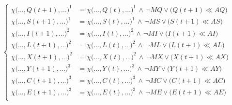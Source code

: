 \begin{equation}
 \begin{cases} 
 \chi\big(\dotsc, Q(t + 1), \dotsc \big)^1 	& = \chi\big(\dotsc, Q(t), \dotsc \big)^1 \, \wedge \, \neg MQ \vee \big(Q(t + 1) \ll AQ\big) \\  
 \chi\big(\dotsc, S(t + 1), \dotsc \big)^1	& = \chi\big(\dotsc, S(t), \dotsc \big)^1 \, \wedge \, \neg MS \vee \big(S(t + 1) \ll AS\big) \\   
 
 \chi\big(\dotsc, I(t + 1), \dotsc \big)^2 	& = \chi\big(\dotsc, I(t), \dotsc \big)^2 \, \wedge \, \neg MI \vee \big(I(t + 1) \ll AI\big) \\  
 \chi\big(\dotsc, L(t + 1), \dotsc \big)^2 	& = \chi\big(\dotsc, L(t), \dotsc \big)^2 \, \wedge \, \neg ML \vee \big(L(t + 1) \ll AL\big) \\  
 \chi\big(\dotsc, X(t + 1), \dotsc \big)^2 	& = \chi\big(\dotsc, X(t), \dotsc \big)^2 \, \wedge \, \neg MX \vee \big(X(t + 1) \ll AX\big) \\  
 
 \chi\big(\dotsc, Y(t + 1), \dotsc \big)^3 	& = \chi\big(\dotsc, Y(t), \dotsc \big)^3 \, \wedge \, \neg MY \vee \big(Y(t + 1) \ll AY\big) \\   
 \chi\big(\dotsc, C(t + 1), \dotsc \big)^3 	& = \chi\big(\dotsc, C(t), \dotsc \big)^3 \, \wedge \, \neg MC \vee \big(C(t + 1) \ll AC\big) \\  
 \chi\big(\dotsc, E(t + 1), \dotsc \big)^3 	& = \chi\big(\dotsc, E(t), \dotsc \big)^3 \, \wedge \, \neg ME \vee \big(E(t + 1) \ll AE\big) \\
 \end{cases}
 \label{eq:operadoresSet}
\end{equation}

